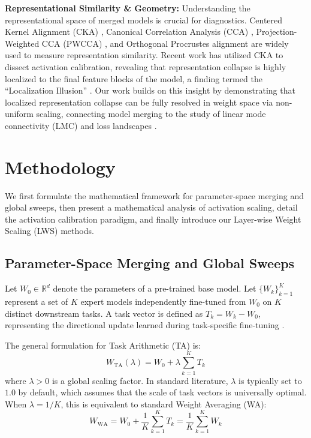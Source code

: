 \documentclass{article}
\theoremstyle{plain}
\theoremstyle{definition}
\theoremstyle{remark}
\begin{document}
\textbf{Representational Similarity \& Geometry:} Understanding the representational space of merged models is crucial for diagnostics. Centered Kernel Alignment (CKA) \cite{cka_paper}, Canonical Correlation Analysis (CCA) \cite{cca_paper}, Projection-Weighted CCA (PWCCA) \cite{pwcca_paper}, and Orthogonal Procrustes alignment \cite{orthogonal_procrustes} are widely used to measure representation similarity. Recent work has utilized CKA to dissect activation calibration, revealing that representation collapse is highly localized to the final feature blocks of the model, a finding termed the ``Localization Illusion'' \cite{deconstructing_cal}. Our work builds on this insight by demonstrating that localized representation collapse can be fully resolved in weight space via non-uniform scaling, connecting model merging to the study of linear mode connectivity (LMC) \cite{lmc1, lmc2} and loss landscapes \cite{loss_landscapes, weight_space_geometry}.

\section{Methodology}
\label{sec:methodology}

We first formulate the mathematical framework for parameter-space merging and global sweeps, then present a mathematical analysis of activation scaling, detail the activation calibration paradigm, and finally introduce our Layer-wise Weight Scaling (LWS) methods.

\subsection{Parameter-Space Merging and Global Sweeps}
Let $W_0 \in \mathbb{R}^d$ denote the parameters of a pre-trained base model. Let $\{W_k\}_{k=1}^K$ represent a set of $K$ expert models independently fine-tuned from $W_0$ on $K$ distinct downstream tasks. A task vector is defined as $T_k = W_k - W_0$, representing the directional update learned during task-specific fine-tuning \cite{task_arithmetic}.

The general formulation for Task Arithmetic (TA) is:
\begin{equation}
    W_{\text{TA}}(\lambda) = W_0 + \lambda \sum_{k=1}^K T_k
\end{equation}
where $\lambda > 0$ is a global scaling factor. In standard literature, $\lambda$ is typically set to $1.0$ by default, which assumes that the scale of task vectors is universally optimal. When $\lambda = 1/K$, this is equivalent to standard Weight Averaging (WA):
\begin{equation}
    W_{\text{WA}} = W_0 + \frac{1}{K} \sum_{k=1}^K T_k = \frac{1}{K} \sum_{k=1}^K W_k
\end{equation}
\end{document}
